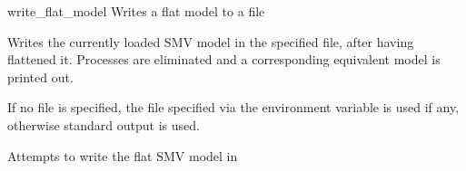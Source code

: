 \begin{nusmvCommand} {write\_flat\_model} {Writes a flat model to a file}


Writes the currently loaded SMV model in the specified file, after
having flattened it. Processes are eliminated and a
corresponding equivalent model is printed out.

If no file is specified, the file specified via the environment
variable  is used if any, otherwise
standard output is used.

\begin{cmdOpt}
 {Attempts to write the flat
SMV model in }
\end{cmdOpt}

\end{nusmvCommand}
